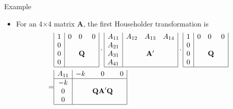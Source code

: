 \documentclass{beamer}
\begin{document}
\begin{frame}{Example}
    \begin{itemize}
        \item For an 4$\times$4 matrix $\mathbf{A}$, the first Householder transformation is
        \begin{align*}
            &\begin{array}{|l|lll|}
           1 & 0 & 0 & 0 \\
           0 & & & \\
            0 & & \mathbf{Q} & \\
            0 & & & \\
            \hline
            \end{array}\cdot \begin{array}{|c|ccc|}
           A_{11} & A_{12} & A_{13} & A_{14} \\
           A_{21} & & & \\
            A_{31} & & \mathbf{A}^{\prime} & \\
            A_{41} & & & \\
            \hline
            \end{array} \cdot
            \begin{array}{|l|lll|}
           1 & 0 & 0 & 0 \\
           0 & & & \\
            0 & & \mathbf{Q} & \\
            0 & & & \\
            \hline
            \end{array}\\
            =& \begin{array}{|c|ccc|}
               A_{11} & -k & 0 & 0 \\
                \hline-k & & & \\
                0 & & \mathbf{Q A}^{\prime} \mathbf{Q} & \\
                0 & & & \\
                \hline
                \end{array}
            \end{align*}
    \end{itemize}
\end{frame}
\end{document}
